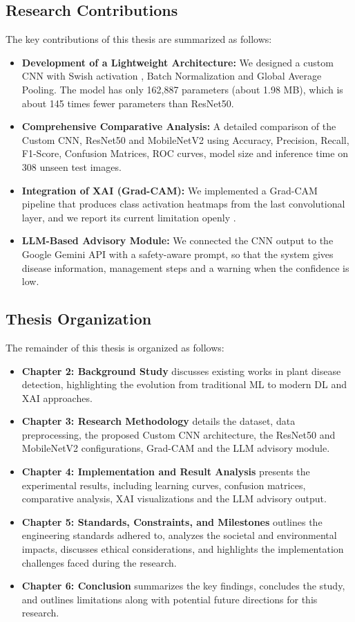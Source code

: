\subsection{Research Contributions}
The key contributions of this thesis are summarized as follows:
\begin{itemize}
    \item \textbf{Development of a Lightweight Architecture:} We designed a custom CNN with Swish activation \cite{ramachandran2017swish}, Batch Normalization \cite{ioffe2015batch} and Global Average Pooling. The model has only 162,887 parameters (about 1.98 MB), which is about 145 times fewer parameters than ResNet50.
    \item \textbf{Comprehensive Comparative Analysis:} A detailed comparison of the Custom CNN, ResNet50 and MobileNetV2 using Accuracy, Precision, Recall, F1-Score, Confusion Matrices, ROC curves, model size and inference time on 308 unseen test images.
    \item \textbf{Integration of XAI (Grad-CAM):} We implemented a Grad-CAM pipeline that produces class activation heatmaps from the last convolutional layer, and we report its current limitation openly \cite{selvaraju2017grad}.
    \item \textbf{LLM-Based Advisory Module:} We connected the CNN output to the Google Gemini API with a safety-aware prompt, so that the system gives disease information, management steps and a warning when the confidence is low.
\end{itemize}

\subsection{Thesis Organization}
The remainder of this thesis is organized as follows:
\begin{itemize}
    \item \textbf{Chapter 2: Background Study} discusses existing works in plant disease detection, highlighting the evolution from traditional ML to modern DL and XAI approaches.
    \item \textbf{Chapter 3: Research Methodology} details the dataset, data preprocessing, the proposed Custom CNN architecture, the ResNet50 and MobileNetV2 configurations, Grad-CAM and the LLM advisory module.
    \item \textbf{Chapter 4: Implementation and Result Analysis} presents the experimental results, including learning curves, confusion matrices, comparative analysis, XAI visualizations and the LLM advisory output.
    \item \textbf{Chapter 5: Standards, Constraints, and Milestones} outlines the engineering standards adhered to, analyzes the societal and environmental impacts, discusses ethical considerations, and highlights the implementation challenges faced during the research.
    \item \textbf{Chapter 6: Conclusion} summarizes the key findings, concludes the study, and outlines limitations along with potential future directions for this research.
\end{itemize}

